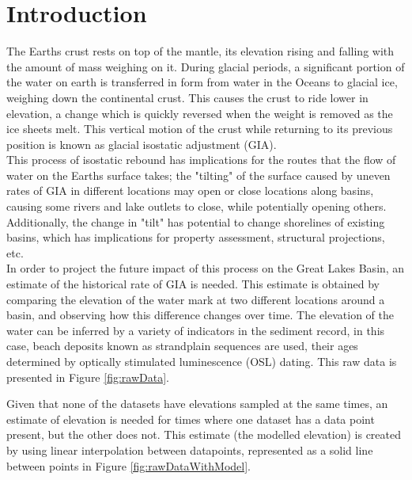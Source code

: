 \documentclass{article}
\begin{document}



\newpage

\section{Introduction}
 The Earths crust rests on top of the mantle, its elevation rising and falling
 with the amount of mass weighing on it. During glacial periods, a significant portion
 of the water on earth is transferred in form from water in the Oceans to glacial ice,
 weighing down the continental crust. This causes the crust to ride lower in elevation,
 a change which is quickly reversed when the weight is removed as the ice sheets melt.
 This vertical motion of the crust while returning to its previous position is known
 as glacial isostatic adjustment (GIA).\\
 
 This process of isostatic rebound has implications for the routes that the flow
 of water on the Earths surface takes; the "tilting" of the surface caused by 
 uneven rates of GIA in different locations may open or close locations along basins,
 causing some rivers and lake outlets to close, while potentially opening others.
 Additionally, the change in "tilt" has potential to change shorelines of existing
 basins, which has implications for property assessment, structural projections, etc.\\
 
 In order to project the future impact of this process on the Great Lakes Basin,
 an estimate of the historical rate of GIA is needed. This estimate is obtained by
 comparing the elevation of the water mark at two different locations around a basin, and
 observing how this difference changes over time. The elevation of the water can be inferred
 by a variety of indicators in the sediment record, in this case, beach deposits known
 as strandplain sequences are used, their ages determined by optically stimulated
 luminescence (OSL) dating. This raw data is presented in Figure \ref{fig:rawData}.\\


\newpage 
 
 Given that none of the datasets have elevations sampled
 at the same times, an estimate of elevation is needed for times where one dataset
 has a data point present, but the other does not. This estimate 
 (the modelled elevation) is created by using linear interpolation between datapoints,
 represented as a solid line between points in Figure \ref{fig:rawDataWithModel}.\\

 
\newpage





\end{document}
